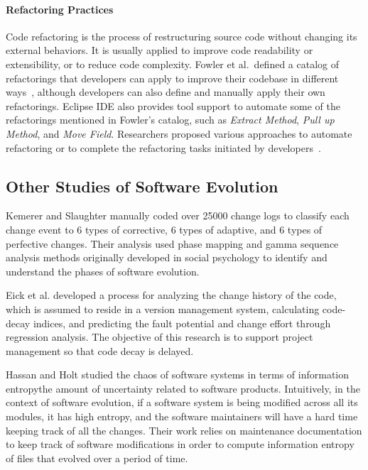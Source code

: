 \documentclass[runningheads,a4paper]{llncs}
\begin{document}
\paragraph{Refactoring Practices} 
Code refactoring is the process of restructuring source code without changing its external behaviors. It is usually applied to improve code readability or extensibility, or to reduce code complexity. 
Fowler et al.~defined a catalog of refactorings that developers can apply to improve their codebase in different ways~\cite{1999:RID}, although developers can also define and manually apply their own refactorings. Eclipse IDE also provides tool support to automate some of the refactorings mentioned in Fowler's catalog, such as \emph{Extract Method}, \emph{Pull up Method}, and \emph{Move Field}. Researchers proposed various approaches to automate refactoring or to complete the refactoring tasks initiated by developers~\cite{Griswold:1992,Balazinska1999,Dig:2009,Ge:2012,Chen:2013,Lee:2013,Tsantalis2013:icsm,Meng:2015,Kim:2016}.

\subsection{Other Studies of Software Evolution} 
Kemerer and Slaughter \cite{Kemerer1999} manually coded over 25000 change logs to classify each change event to 6 types of corrective, 6 types of adaptive, and 6 types of perfective changes. Their analysis used phase mapping and gamma sequence analysis methods originally developed in social psychology to identify and understand the phases of software evolution. 

Eick et al. \cite{Eick2001} developed a process for analyzing the change history of the code, which is assumed to reside in a version management system, calculating code-decay indices, and predicting the fault potential and change effort through regression analysis. The objective of this research is to support project management so that code decay is delayed. 

Hassan and Holt \cite{Hassan2003} studied the chaos of software systems in terms of information entropy\textemdash the amount of uncertainty related to software products. Intuitively, in the context of software evolution, if a software system is being modified across all its modules, it has high entropy, and the software maintainers will have a hard time keeping track of all the changes. Their work relies on maintenance documentation to keep track of software modifications in order to compute information entropy of files that evolved over a period of time. 
\end{document}
